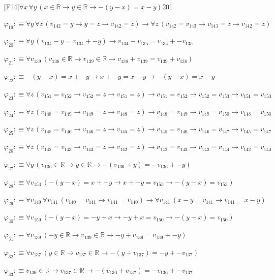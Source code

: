 \begin{fullproof}{[F14]}{$\forall x\,\forall y\,(x \in \mathbb{R} \to y \in \mathbb{R} \to -(y - x) = x - y)$}{201}
\begin{abbrevlist}
\item $\varphi_{19} :\equiv \forall y\,\forall z\,(v_{142} = y \to y = z \to v_{142} = z) \to \forall z\,(v_{142} = v_{143} \to v_{143} = z \to v_{142} = z)$
\item $\varphi_{20} :\equiv \forall y\,(v_{134} - y = v_{134} + -y) \to v_{134} - v_{135} = v_{134} + -v_{135}$
\item $\varphi_{21} :\equiv \forall v_{139}\,(v_{138} \in \mathbb{R} \to v_{139} \in \mathbb{R} \to v_{138} + v_{139} = v_{139} + v_{138})$
\item $\varphi_{22} :\equiv -(y - x) = x + -y \to x + -y = x - y \to -(y - x) = x - y$
\item $\varphi_{23} :\equiv \forall z\,(v_{151} = v_{152} \to v_{152} = z \to v_{151} = z) \to v_{151} = v_{152} \to v_{152} = v_{153} \to v_{151} = v_{153}$
\item $\varphi_{24} :\equiv \forall z\,(v_{148} = v_{149} \to v_{149} = z \to v_{148} = z) \to v_{148} = v_{149} \to v_{149} = v_{150} \to v_{148} = v_{150}$
\item $\varphi_{25} :\equiv \forall z\,(v_{145} = v_{146} \to v_{146} = z \to v_{145} = z) \to v_{145} = v_{146} \to v_{146} = v_{147} \to v_{145} = v_{147}$
\item $\varphi_{26} :\equiv \forall z\,(v_{142} = v_{143} \to v_{143} = z \to v_{142} = z) \to v_{142} = v_{143} \to v_{143} = v_{144} \to v_{142} = v_{144}$
\item $\varphi_{27} :\equiv \forall y\,(v_{136} \in \mathbb{R} \to y \in \mathbb{R} \to -(v_{136} + y) = -v_{136} + -y)$
\item $\varphi_{28} :\equiv \forall v_{153}\,(-(y - x) = x + -y \to x + -y = v_{153} \to -(y - x) = v_{153})$
\item $\varphi_{29} :\equiv \forall v_{140}\,\forall v_{141}\,(v_{140} = v_{141} \to v_{141} = v_{140}) \to \forall v_{141}\,(x - y = v_{141} \to v_{141} = x - y)$
\item $\varphi_{30} :\equiv \forall v_{150}\,(-(y - x) = -y + x \to -y + x = v_{150} \to -(y - x) = v_{150})$
\item $\varphi_{31} :\equiv \forall v_{139}\,(-y \in \mathbb{R} \to v_{139} \in \mathbb{R} \to -y + v_{139} = v_{139} + -y)$
\item $\varphi_{32} :\equiv \forall v_{137}\,(y \in \mathbb{R} \to v_{137} \in \mathbb{R} \to -(y + v_{137}) = -y + -v_{137})$
\item $\varphi_{33} :\equiv v_{136} \in \mathbb{R} \to v_{137} \in \mathbb{R} \to -(v_{136} + v_{137}) = -v_{136} + -v_{137}$

\end{abbrevlist}
\end{fullproof}
